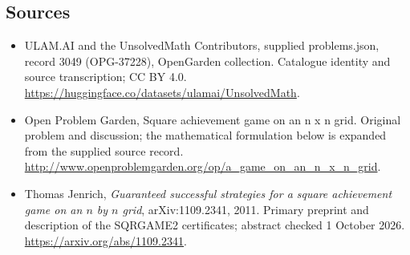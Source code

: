 \documentclass[11pt,a4paper]{article}
\begin{document}
\subsection{Sources}
\begin{itemize}
\item[S1] ULAM.AI and the UnsolvedMath Contributors, supplied problems.json, record 3049 (OPG-37228), OpenGarden collection. Catalogue identity and source transcription; CC BY 4.0.
\url{https://huggingface.co/datasets/ulamai/UnsolvedMath}.
\item[S2] Open Problem Garden, Square achievement game on an n x n grid. Original problem and discussion; the mathematical formulation below is expanded from the supplied source record.
\url{http://www.openproblemgarden.org/op/a_game_on_an_n_x_n_grid}.

\item[R1] Thomas Jenrich, \emph{Guaranteed successful strategies for
a square achievement game on an $n$ by $n$ grid}, arXiv:1109.2341,
2011. Primary preprint and description of the SQRGAME2 certificates;
abstract checked 1 October 2026.
\url{https://arxiv.org/abs/1109.2341}.

\end{itemize}
\end{document}
